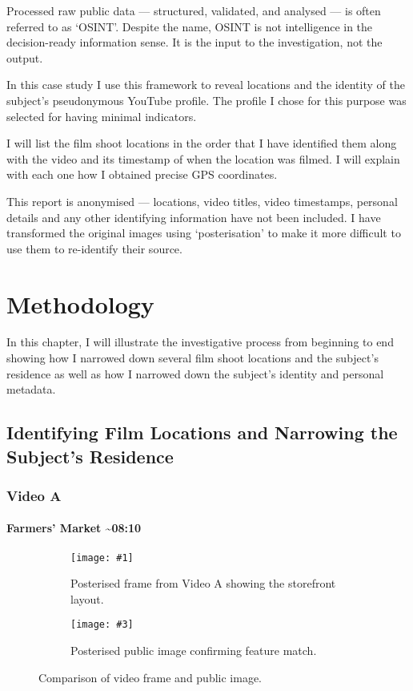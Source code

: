 \documentclass[a4paper,11pt]{report}
\newcommand{\comparison}[5] {
    \begin{figure}[htbp]
        \centering
        
        \begin{subfigure}[t]{0.45\textwidth}
            \centering
            \texttt{[image: \#1]}
            \caption{#2}
        \end{subfigure}
        \hfill
        \begin{subfigure}[t]{0.45\textwidth}
            \centering
            \texttt{[image: \#3]}
            \caption{#4}
        \end{subfigure}
    
        \caption{#5}
    \end{figure}
}
\begin{document}
Processed raw public data --- structured, validated, and analysed --- is often referred to as `OSINT'. Despite the name, OSINT is not intelligence in the decision-ready information sense. It is the input to the investigation, not the output.

In this case study I use this framework to reveal locations and the identity of the subject's pseudonymous YouTube profile. The profile I chose for this purpose was selected for having minimal indicators.

I will list the film shoot locations in the order that I have identified them along with the video and its timestamp of when the location was filmed. I will explain with each one how I obtained precise GPS coordinates.

This report is anonymised --- locations, video titles, video timestamps, personal details and any other identifying information have not been included. I have transformed the original images using `posterisation' to make it more difficult to use them to re-identify their source.

\chapter{Methodology}

In this chapter, I will illustrate the investigative process from beginning to end showing how I narrowed down several film shoot locations and the subject's residence as well as how I narrowed down the subject's identity and personal metadata.

\section{Identifying Film Locations and Narrowing the Subject's Residence}

\subsection{Video A}

\subsubsection{Farmers' Market \~{}08:10}

\comparison
    {images/grocery-youtube.png}
    {Posterised frame from Video A showing the storefront layout.}
    {images/grocery-streetview.png}
    {Posterised public image confirming feature match.}
    {Comparison of video frame and public image.}
    
\end{document}

